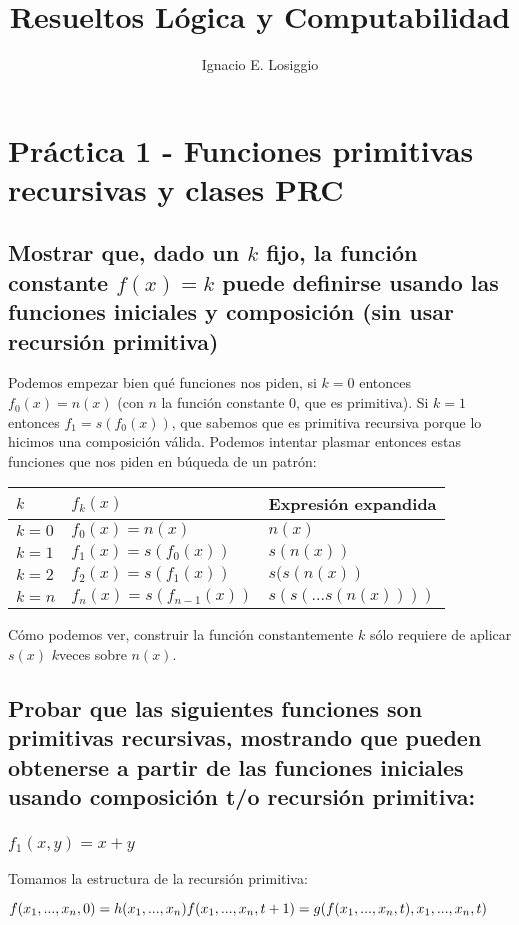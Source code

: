 \documentclass[11pt]{article} %
\title{Resueltos Lógica y Computabilidad}
\author{Ignacio E. Losiggio}
\newlength{\desarrollolen}
\newcommand{\desarrollo}[2][3em]{

    \hspace{2em}
    \addtolength{\desarrollolen}{-#1}
    \begin{minipage}{\desarrollolen}
        #2
    \end{minipage}
    \addtolength{\desarrollolen}{#1}

}
\begin{document}
\maketitle

\section{Práctica 1 - Funciones primitivas recursivas y clases PRC}

\subsection{Mostrar que, dado un $k$ fijo, la función constante $f(x)=k$ puede definirse usando las funciones iniciales y composición (sin usar recursión primitiva)}

Podemos empezar bien qué funciones nos piden, si $k = 0$  entonces $f_0(x)=n(x)$ (con $n$ la función constante $0$, que es primitiva). Si $k = 1$ entonces $f_1 = s(f_0(x))$, que sabemos que es primitiva recursiva porque lo hicimos una composición válida. Podemos intentar plasmar entonces estas funciones que nos piden en búqueda de un patrón:
\desarrollo{
\begin{tabular}{lll}
$k$     & $f_k(x)$                 & Expresión expandida \\ \hline
$k = 0$ & $f_0(x) = n(x)$          & $n(x)$ \\
$k = 1$ & $f_1(x) = s(f_0(x))$     & $s(n(x))$ \\
$k = 2$ & $f_2(x) = s(f_1(x))$     & $s(s(n(x))$ \\
$k = n$ & $f_n(x) = s(f_{n-1}(x))$ & $s(s(...s(n(x))))$ \\
\end{tabular}
}
Cómo podemos ver, construir la función constantemente $k$ sólo requiere de aplicar $s(x)$ $k$veces sobre $n(x)$.

\subsection{Probar que las siguientes funciones son primitivas recursivas, mostrando que pueden obtenerse a partir de las funciones iniciales usando composición t/o recursión primitiva:}

\subsubsection{$f_1(x,y)=x+y$}

Tomamos la estructura de la recursión primitiva:
\desarrollo{$
f(x_1,...,x_n,0)   = h(x_1,...,x_n) \\
f(x_1,...,x_n,t+1) = g(f(x_1,...,x_n,t),x_1,...,x_n,t)
$}
\end{document}
